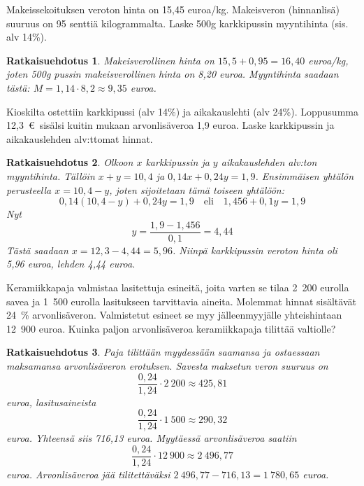 \documentclass[a4paper,10pt]{article}\usepackage[]{graphicx}\usepackage[]{color}
\newtheorem*{ratk}{Ratkaisuehdotus}
\begin{document}
\begin{teht}
  Makeissekoituksen veroton hinta on 15,45 euroa/kg. Makeisveron (hinnanlisä) suuruus on 95 senttiä kilogrammalta. Laske 500g karkkipussin myyntihinta (sis. alv 14\%).
\end{teht}
\begin{ratk}
  Makeisverollinen hinta on \(15{,}5+0{,}95 = 16{,}40\) euroa/kg, joten 500g pussin makeisverollinen hinta on 8,20 euroa. Myyntihinta saadaan tästä: \(M = 1,14\cdot8,2\approx9{,}35\) euroa.
\end{ratk}



  \begin{teht}
  Kioskilta ostettiin karkkipussi (alv 14\%) ja aikakauslehti (alv 24\%). Loppusumma 12{,}3~\euro\ sisälsi kuitin mukaan arvonlisäveroa 1{,}9 euroa. Laske karkkipussin ja aikakauslehden alv:ttomat hinnat.
\end{teht}
\begin{ratk}
  Olkoon \(x\) karkkipussin ja \(y\) aikakauslehden alv:ton myyntihinta. Tällöin \(x+y = 10{,}4\) ja \(0,14x + 0,24y = 1{,}9\). Ensimmäisen yhtälön perusteella \(x = 10{,}4 - y\), joten sijoitetaan tämä toiseen yhtälöön:
  \[
    0,14(10{,}4-y)+0,24y = 1{,}9 \quad\text{eli}\quad1{,}456 + 0{,}1y = 1{,}9
    \]
  Nyt
  \[
    y = \frac{1{,}9-1{,}456}{0{,}1} = 4{,}44
  \]
  Tästä saadaan \(x = 12{,}3 -4{,}44 = 5{,}96\). Niinpä karkkipussin veroton hinta oli  5{,}96 euroa, lehden 4{,}44 euroa.
\end{ratk}


\begin{teht}
  Keramiikkapaja valmistaa lasitettuja esineitä, joita varten se tilaa 2~200 eurolla savea ja 1~500 eurolla lasitukseen tarvittavia aineita. Molemmat hinnat sisältävät 24~\% arvonlisäveron. Valmistetut esineet se myy jälleenmyyjälle yhteishintaan 12~900 euroa. Kuinka paljon arvonlisäveroa keramiikkapaja tilittää valtiolle?
\end{teht}
\begin{ratk}
Paja tilittään myydessään saamansa ja ostaessaan maksamansa arvonlisäveron erotuksen. Savesta maksetun veron suuruus on 
  \[
  \frac{0,24}{1,24}\cdot2~200\approx 425{,}81
  \]
euroa, lasitusaineista 
  \[
  \frac{0,24}{1,24}\cdot1~500\approx290{,}32
  \]
euroa. Yhteensä siis 716{,}13 euroa. Myytäessä arvonlisäveroa saatiin
\[
  \frac{0,24}{1,24}\cdot12~900\approx2~496{,}77
\]
euroa. Arvonlisäveroa jää tilitettäväksi \(2~496{,}77 - 716{,}13 = 1~780{,}65\) euroa.
\end{ratk}
\end{document}
